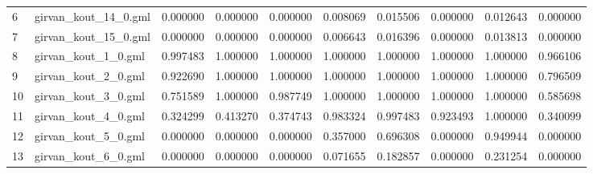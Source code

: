 \begin{tabular}{llrrrrrrrr}
6  &        girvan\_kout\_14\_0.gml &                            0.000000 &                       0.000000 &                          0.000000 &                      0.008069 &                        0.015506 &                     0.000000 &                            0.012643 &                                0.000000 \\
7  &        girvan\_kout\_15\_0.gml &                            0.000000 &                       0.000000 &                          0.000000 &                      0.006643 &                        0.016396 &                     0.000000 &                            0.013813 &                                0.000000 \\
8  &         girvan\_kout\_1\_0.gml &                            0.997483 &                       1.000000 &                          1.000000 &                      1.000000 &                        1.000000 &                     1.000000 &                            1.000000 &                                0.966106 \\
9  &         girvan\_kout\_2\_0.gml &                            0.922690 &                       1.000000 &                          1.000000 &                      1.000000 &                        1.000000 &                     1.000000 &                            1.000000 &                                0.796509 \\
10 &         girvan\_kout\_3\_0.gml &                            0.751589 &                       1.000000 &                          0.987749 &                      1.000000 &                        1.000000 &                     1.000000 &                            1.000000 &                                0.585698 \\
11 &         girvan\_kout\_4\_0.gml &                            0.324299 &                       0.413270 &                          0.374743 &                      0.983324 &                        0.997483 &                     0.923493 &                            1.000000 &                                0.340099 \\
12 &         girvan\_kout\_5\_0.gml &                            0.000000 &                       0.000000 &                          0.000000 &                      0.357000 &                        0.696308 &                     0.000000 &                            0.949944 &                                0.000000 \\
13 &         girvan\_kout\_6\_0.gml &                            0.000000 &                       0.000000 &                          0.000000 &                      0.071655 &                        0.182857 &                     0.000000 &                            0.231254 &                                0.000000 \\

\end{tabular}
